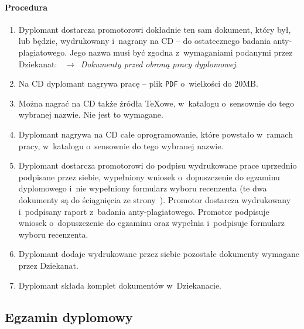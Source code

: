 \paragraph{Procedura}\label{sec:dod:procedura}
\begin{enumerate}
  \item Dyplomant dostarcza promotorowi dokładnie ten sam dokument, który był, lub będzie, wydrukowany i~nagrany na CD -- do ostatecznego badania anty-plagiatowego. Jego nazwa musi być zgodna z~wymaganiami podanymi przez Dziekanat: ~$\rightarrow$~{\em Dokumenty przed obroną pracy dyplomowej}.
  \item Na CD dyplomant nagrywa pracę -- plik {\tt PDF} o~wielkości do 20\usp{}MB.\label{itm:dod:plikPDF}
  \item Można nagrać na CD także źródła \TeX{}owe, w~katalogu o~sensownie do tego wybranej nazwie. Nie jest to wymagane.
  \item Dyplomant nagrywa na CD całe oprogramowanie, które powstało w~ramach pracy, w~katalogu o~sensownie do tego wybranej nazwie.
  \item Dyplomant dostarcza promotorowi do podpisu wydrukowane prace uprzednio podpisane przez siebie, wypełniony wniosek o~dopuszczenie do egzaminu dyplomowego i~nie wypełniony formularz wyboru recenzenta (te dwa dokumenty są do ściągnięcia ze strony~\cite{wii-dyplom}). Promotor dostarcza wydrukowany i~podpisany raport z~badania anty-plagiatowego. Promotor podpisuje wniosek o~dopuszczenie do egzaminu oraz wypełnia i~podpisuje formularz wyboru recenzenta.
  \item Dyplomant dodaje wydrukowane przez siebie pozostałe dokumenty wymagane przez Dziekanat.
  \item Dyplomant składa komplet dokumentów w~Dziekanacie.
\end{enumerate}


\subsection{Egzamin dyplomowy}
\label{sec:dod:egzamin}

